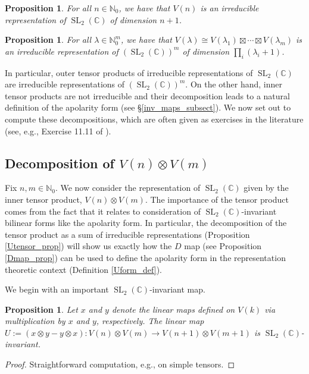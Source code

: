 \documentclass{article}
\newtheorem{proposition}[theorem]{Proposition}
\theoremstyle{definition}
\theoremstyle{plain}
\newcommand{\C}{\mathbb{C}}
\newcommand{\N}{\mathbb{N}}
\DeclareMathOperator{\SL}{SL}
\begin{document}
\begin{proposition}\label{Uirrep_prop}
    For all $n \in \N_0$, we have that $V(n)$ is an irreducible representation of $\SL_2(\C)$ of dimension $n+1$.
\end{proposition}

\begin{proposition}
    For all $\lambda \in \N_0^m$, we have that $V(\lambda) \cong V(\lambda_1) \boxtimes \cdots \boxtimes V(\lambda_m)$ is an irreducible representation of $(\SL_2(\C))^m$ of dimension $\prod_{i}(\lambda_i + 1)$.
\end{proposition}

In particular, outer tensor products of irreducible representations of $\SL_2(\C)$ are irreducible representations of $(\SL_2(\C))^m$. On the other hand, inner tensor products are not irreducible and their decomposition leads to a natural definition of the apolarity form (see \S\ref{inv_maps_subsect}). We now set out to compute these decompositions, which are often given as exercises in the literature (see, e.g., Exercise 11.11 of \cite{fulton2013reptheory}).

\subsection{Decomposition of \texorpdfstring{$V(n) \otimes V(m)$}{V(n) tensor V(m)}}

Fix $n,m \in \N_0$. We now consider the representation of $\SL_2(\C)$ given by the inner tensor product, $V(n) \otimes V(m)$. The importance of the tensor product comes from the fact that it relates to consideration of $\SL_2(\C)$-invariant bilinear forms like the apolarity form. In particular, the decomposition of the tensor product as a sum of irreducible representations (Proposition \ref{Utensor_prop}) will show us exactly how the $D$ map (see Proposition \ref{Dmap_prop}) can be used to define the apolarity form in the representation theoretic context (Definition \ref{Uform_def}).

We begin with an important $\SL_2(\C)$-invariant map.

\begin{proposition}
    Let $x$ and $y$ denote the linear maps defined on $V(k)$ via multiplication by $x$ and $y$, respectively. The linear map $U := (x \otimes y - y \otimes x): V(n) \otimes V(m) \rightarrow V(n+1) \otimes V(m+1)$ is $\SL_2(\C)$-invariant.
\end{proposition}
\begin{proof}
    Straightforward computation, e.g., on simple tensors.
\end{proof}
\end{document}
